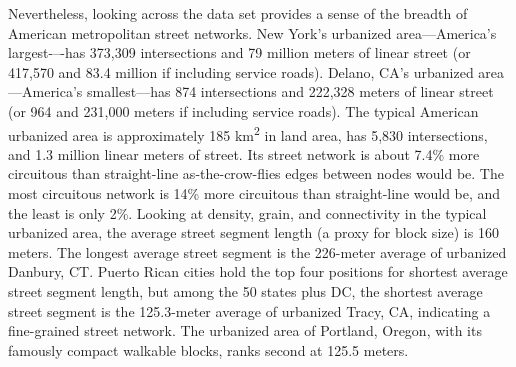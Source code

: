\documentclass[Afour,sageh,times]{sagej}
\begin{document}
Nevertheless, looking across the data set provides a sense of the breadth of American metropolitan street networks. New York's urbanized area---America's largest-–-has 373,309 intersections and 79 million meters of linear street (or 417,570 and 83.4 million if including service roads). Delano, CA's urbanized area---America's smallest---has 874 intersections and 222,328 meters of linear street (or 964 and 231,000 meters if including service roads). The typical American urbanized area is approximately 185 km\textsuperscript{2} in land area, has 5,830 intersections, and 1.3 million linear meters of street. Its street network is about 7.4\% more circuitous than straight-line as-the-crow-flies edges between nodes would be. The most circuitous network is 14\% more circuitous than straight-line would be, and the least is only 2\%. Looking at density, grain, and connectivity in the typical urbanized area, the average street segment length (a proxy for block size) is 160 meters. The longest average street segment is the 226-meter average of urbanized Danbury, CT. Puerto Rican cities hold the top four positions for shortest average street segment length, but among the 50 states plus DC, the shortest average street segment is the 125.3-meter average of urbanized Tracy, CA, indicating a fine-grained street network. The urbanized area of Portland, Oregon, with its famously compact walkable blocks, ranks second at 125.5 meters.
\end{document}
